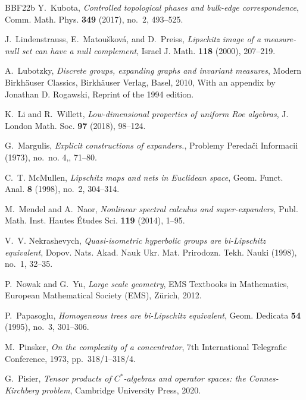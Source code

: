 \documentclass[11pt]{amsart}
\numberwithin{equation}{section}
\theoremstyle{definition}
\theoremstyle{remark}
\numberwithin{equation}{section}
\begin{document}
\begin{thebibliography}{BBF{\etalchar{+}}22b}
Y.~Kubota, \emph{Controlled topological phases and bulk-edge correspondence},
  Comm. Math. Phys. \textbf{349} (2017), no.~2, 493--525.

J.~Lindenstrauss, E.~Matou\v{s}kov\'{a}, and D.~Preiss, \emph{Lipschitz image
  of a measure-null set can have a null complement}, Israel J. Math.
  \textbf{118} (2000), 207--219. 

A.~Lubotzky, \emph{Discrete groups, expanding graphs and invariant measures},
  Modern Birkh\"{a}user Classics, Birkh\"{a}user Verlag, Basel, 2010, With an
  appendix by Jonathan D. Rogawski, Reprint of the 1994 edition. 

K.~Li and R.~Willett, \emph{Low-dimensional properties of uniform {R}oe
  algebras}, J. London Math. Soc. \textbf{97} (2018), 98--124.

G.~Margulis, \emph{Explicit constructions of expanders.}, Problemy Pereda\v{c}i
  Informacii (1973), no.~no. 4,, 71--80. 

C.~T. McMullen, \emph{Lipschitz maps and nets in {E}uclidean space}, Geom.
  Funct. Anal. \textbf{8} (1998), no.~2, 304--314. 

M.~Mendel and A.~Naor, \emph{Nonlinear spectral calculus and super-expanders},
  Publ. Math. Inst. Hautes \'{E}tudes Sci. \textbf{119} (2014), 1--95.

V.~V. Nekrashevych, \emph{Quasi-isometric hyperbolic groups are bi-{L}ipschitz
  equivalent}, Dopov. Nats. Akad. Nauk Ukr. Mat. Prirodozn. Tekh. Nauki (1998),
  no.~1, 32--35. 

P.~Nowak and G.~Yu, \emph{Large scale geometry}, EMS Textbooks in Mathematics,
  European Mathematical Society (EMS), Z\"urich, 2012. 

P.~Papasoglu, \emph{Homogeneous trees are bi-{L}ipschitz equivalent}, Geom.
  Dedicata \textbf{54} (1995), no.~3, 301--306. 

M.~Pinsker, \emph{On the complexity of a concentrator}, 7th International
  Telegrafic Conference, 1973, pp.~318/1--318/4.

G.~Pisier, \emph{Tensor products of ${C^*}$-algebras and operator spaces: the
  {C}onnes-{K}irchberg problem}, Cambridge University Press, 2020.


\end{thebibliography}
\end{document}
